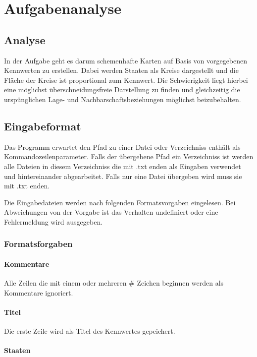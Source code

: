 \chapter{Aufgabenanalyse}
\label{chap:Aufgabenanalyse}

\section{Analyse}
In der Aufgabe geht es darum schemenhafte Karten auf Basis von vorgegebenen Kennwerten zu erstellen.
Dabei werden Staaten als Kreise dargestellt und die Fläche der Kreise ist proportional zum Kennwert.
Die Schwierigkeit liegt hierbei eine möglichst überschneidungsfreie Darstellung zu finden
und gleichzeitig die urspünglichen Lage- und Nachbarschaftsbeziehungen möglichst beizubehalten.

\section{Eingabeformat}

Das Programm erwartet den Pfad zu einer Datei oder Verzeichniss enthält als Kommandozeilenparameter.
Falls der übergebene Pfad ein Verzeichniss ist werden alle Dateien in diesem Verzeichniss die mit .txt enden als Eingaben verwendet und hintereinander abgearbeitet.
Falls nur eine Datei übergeben wird muss sie mit .txt enden.

Die Eingabedateien werden nach folgenden Formatsvorgaben eingelesen. Bei Abweichungen von der Vorgabe ist das Verhalten undefiniert oder eine Fehlermeldung wird ausgegeben.

\subsection{Formatsforgaben}

\subsubsection{Kommentare}
Alle Zeilen die mit einem oder mehreren \# Zeichen beginnen werden als Kommentare ignoriert.

\subsubsection{Titel}
Die erste Zeile wird als Titel des Kennwertes gepeichert.

\subsubsection{Staaten}

